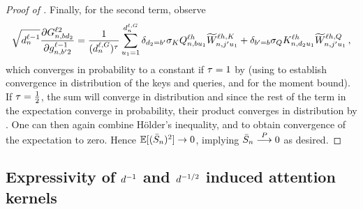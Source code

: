 \begin{proof}[Proof of ]
    Finally, for the second term, observe
    \begin{align*}
        \sqrt{d_{n}^{\ell - 1}}
        \frac{
            \partial 
            G_{n, b d_2}^{\ell 2}
        }{
            \partial g_{n, b' 2}^{\ell - 1}
        }
        =
        \frac{1}{(d_{n}^{\ell, G})^{\tau}}
        \sum_{u_1 = 1}^{d_{n}^{\ell, G}}
            \delta_{d_2 = b'}
            \sigma_{K}
            Q_{n, b u_1}^{\ell h}
            \widetilde{W}_{n, j' u_1}^{\ell h , K}
            +
            \delta_{b' = b}
            \sigma_{Q}
            K_{n, d_2 u_1}^{\ell h}
                \widetilde{W}_{n, j' u_1}^{\ell h , Q}
        \, ,
    \end{align*}
    which converges in probability to a constant if $\tau = 1$ by  (using \citep{yang2019v2} to establish convergence in distribution of the keys and queries, and  for the moment bound).
    If $\tau = \frac{1}{2}$, the sum will converge in distribution \citep{yang2019v2} and since the rest of the term in the expectation converge in probability, their product converges in distribution by .
    One can then again combine H{\" o}lder's inequality,  and  to obtain convergence of the expectation to zero.
    Hence $\operatorname*{\mathbb{E}} [ (\bar{S}_{n})^2 ] \to 0$, implying $\bar{S}_{n} \overset{P}{\longrightarrow} 0$ as desired.
\end{proof}



\subsection{Expressivity of $d^{-1}$ and $d^{-1/2}$ induced attention kernels}

\linearNoConv*


